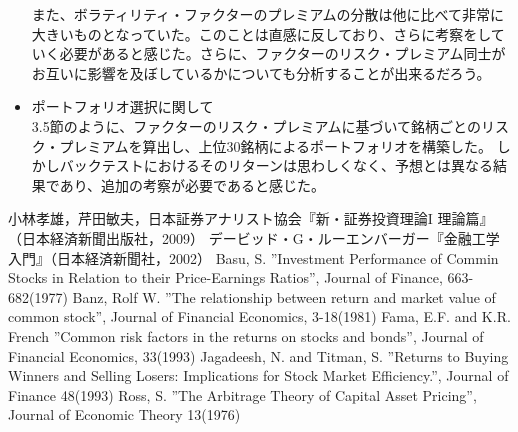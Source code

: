 \documentclass[11pt]{jreport}
\begin{document}
\begin{itemize}
\quad また、ボラティリティ・ファクターのプレミアムの分散は他に比べて非常に大きいものとなっていた。このことは直感に反しており、さらに考察をしていく必要があると感じた。さらに、ファクターのリスク・プレミアム同士がお互いに影響を及ぼしているかについても分析することが出来るだろう。
\item{ポートフォリオ選択に関して}\\
\quad 3.5節のように、ファクターのリスク・プレミアムに基づいて銘柄ごとのリスク・プレミアムを算出し、上位30銘柄によるポートフォリオを構築した。
しかしバックテストにおけるそのリターンは思わしくなく、予想とは異なる結果であり、追加の考察が必要であると感じた。

\end{itemize}


\begin{thebibliography}{30}
	 小林孝雄，芹田敏夫，日本証券アナリスト協会『新・証券投資理論I 理論篇』（日本経済新聞出版社，2009）
	 デービッド・G・ルーエンバーガー『金融工学入門』（日本経済新聞社，2002）
	 Basu, S. ''Investment Performance of Commin Stocks in Relation to their Price-Earnings Ratios'', Journal of Finance, 663-682(1977)
	 Banz, Rolf W. ''The relationship between return and market value of common stock'', Journal of Financial Economics, 3-18(1981)
	 Fama, E.F. and K.R. French ''Common risk factors in the returns on stocks and bonds'', Journal of Financial Economics, 33(1993)
	 Jagadeesh, N. and Titman, S. ''Returns to Buying Winners and Selling Losers: Implications for Stock Market Efficiency.'', Journal of Finance 48(1993)
	 Ross, S. ''The Arbitrage Theory of Capital Asset Pricing'', Journal of Economic Theory 13(1976)
	
\end{thebibliography}
\end{document}
